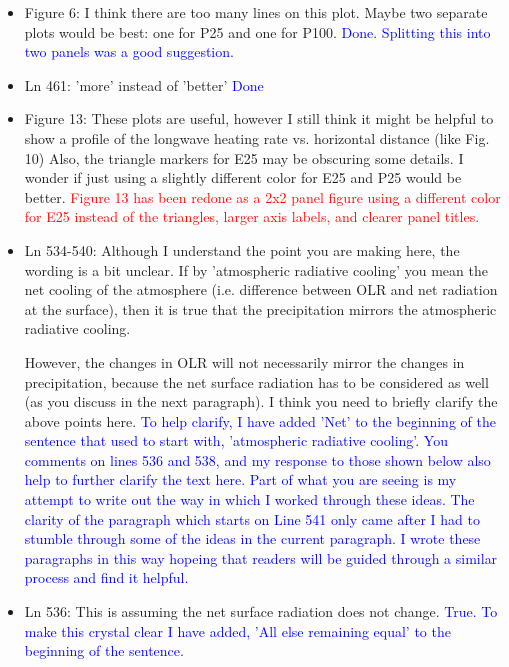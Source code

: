 \documentclass[draft]{agujournal2019}
\begin{document}
\begin{itemize}
  \item Figure 6: I think there are too many lines on this plot. Maybe two separate plots would be best: one for P25 and one for P100.
  \textcolor{blue}{Done.  Splitting this into two panels was a good suggestion.}
  
  \item Ln 461: 'more' instead of 'better'
  \textcolor{blue}{Done}
  
  \item Figure 13: These plots are useful, however I still think it might be helpful to show a profile of the longwave heating rate vs. horizontal distance (like Fig. 10)
%
Also, the triangle markers for E25 may be obscuring some details. 
I wonder if just using a slightly different color for E25 and P25 would be better.
\textcolor{red}{Figure 13 has been redone as a 2x2 panel figure using a different color for E25 instead of the triangles, larger axis labels, and clearer panel titles.}
  
  \item Ln 534-540: Although I understand the point you are making here, the wording is a bit unclear. If by 'atmospheric radiative cooling' you mean the net cooling of the atmosphere (i.e. difference between OLR and net radiation at the surface), then it is true that the precipitation mirrors the atmospheric radiative cooling.  
  
However, the changes in OLR will not necessarily mirror the changes in precipitation, because the net surface radiation has to be considered as well (as you discuss in the next paragraph). 
%
I think you need to briefly clarify the above points here.
  \textcolor{blue}{To help clarify, I have added 'Net' to the beginning of the sentence that used to start with, 'atmospheric radiative cooling'.  You comments on lines 536 and 538, and my response to those shown below also help to further clarify the text here.
  Part of what you are seeing is my attempt to write out the way in which I worked through these ideas.  The clarity of the paragraph which starts on Line 541 only came after I had to stumble through some of the ideas in the current paragraph.  I 
  wrote these paragraphs in this way  
  hopeing that readers will be guided through a similar process and find it helpful.}
  
  \item Ln 536: This is assuming the net surface radiation does not change.
  \textcolor{blue}{True.  To make this crystal clear I have added, 'All else remaining equal' to the beginning of the sentence.}
  

\end{itemize}
\end{document}
